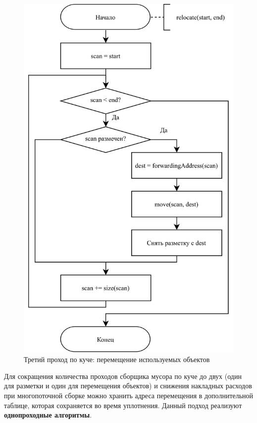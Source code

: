 \begin{figure}[H]
	\centering
	\includegraphics[scale=0.175]{assets/mark-compact-4.png}
	\caption{Третий проход по куче: перемещение используемых объектов}
	\label{fig:mark-compact-4}
\end{figure}

Для сокращения количества проходов сборщика мусора по куче до двух (один для разметки и один для перемещения объектов) и снижения накладных расходов при многопоточной сборке можно хранить адреса перемещения в дополнительной таблице, которая сохраняется во время уплотнения. Данный подход реализуют \textbf{однопроходные алгоритмы}.

